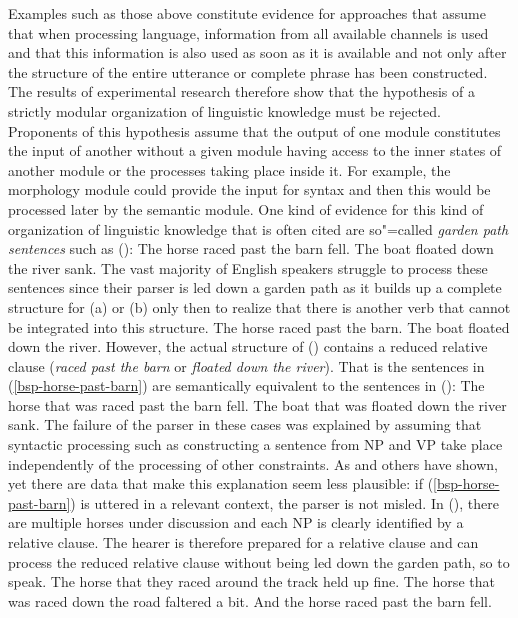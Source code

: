 Examples such as those above constitute evidence for approaches that assume that when processing language, information from all available
channels is used and that this information is also used as soon as it is available and not only after the structure of the entire utterance or
complete phrase has been constructed.
The results of experimental research therefore show that the hypothesis of a strictly modular organization
of linguistic knowledge must be rejected.
Proponents of this hypothesis assume that the output of one module constitutes the input of another without a given module having access
to the inner states of another module or the processes taking place inside it.
For example, the morphology module could provide the input for syntax and then this would be
processed later by the semantic module. One kind of evidence for this kind of organization of linguistic knowledge that is often cited
are so"=called \emph{garden path sentences} such as ():
\eal
\ex\label{bsp-horse-past-barn} 
The horse raced past the barn fell.
\ex The boat floated down the river sank.
\zl
The vast majority of English speakers struggle to process these sentences since their parser is led down a garden path
as it builds up a complete structure for (a) or (b) only then to realize that there is another
verb that cannot be integrated into this structure.
\eal
\ex The horse raced past the barn.
\ex The boat floated down the river.
\zl
However, the actual structure of () contains a reduced relative clause (\emph{raced past
  the barn} or \emph{floated down the river}). That is the sentences in (\ref{bsp-horse-past-barn})
are semantically equivalent to the sentences in ():
\eal
\ex The horse that was raced past the barn fell.
\ex The boat that was floated down the river sank.
\zl
The failure of the parser in these cases was explained by assuming that syntactic processing
such as constructing a sentence from NP and VP take place independently of the processing of other constraints.
As \citet{CS85a} and others have shown, yet there are data that make this explanation seem less plausible: 
if (\ref{bsp-horse-past-barn}) is uttered in a relevant context, the parser is not misled.
In (), there are multiple horses under discussion and each NP is clearly identified by a relative
clause. The hearer is therefore prepared for a relative clause and can process the reduced relative clause
without being led down the garden path, so to speak.
\ea
The horse that they raced around the track held up fine. The horse that was raced down
    the road faltered a bit. And the horse raced past the barn fell.
\z

